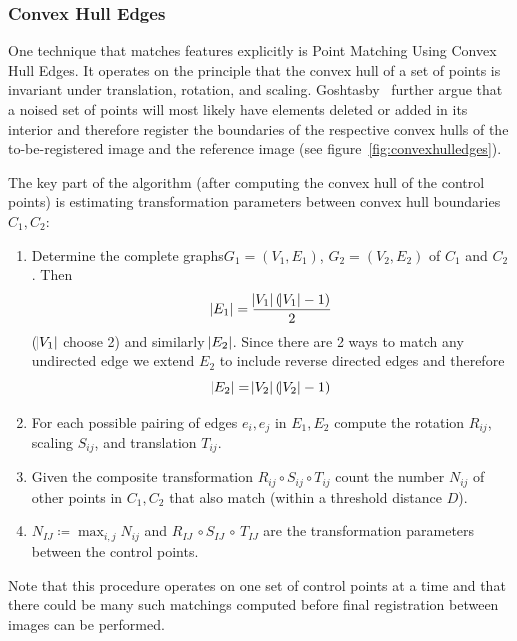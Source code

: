 \subsubsection{Convex Hull Edges}
%
One technique that matches features explicitly is Point Matching Using Convex Hull Edges\cite{Goshtasby1985}.
%
It operates on the principle that the convex hull of a set of points is invariant under translation, rotation, and scaling.
%
Goshtasby \etal~further argue that a noised set of points will most likely have elements deleted or added in its interior and therefore register the boundaries of the respective convex hulls of the to-be-registered image and the reference image (see figure~\ref{fig:convexhulledges}).
%

The key part of the algorithm (after computing the convex hull of the control points) is estimating transformation parameters between convex hull boundaries \(C_1, C_2\):
%
\begin{framed}
	\begin{enumerate}
		\item Determine the complete graphs\footnotemark \(G_1=(V_1, E_1)\), \(G_2 = (V_2,E_2)\) of \(C_1\) and \(C_2\). Then \[\abs{E_1} = \frac{\abs{V_1} (\abs{V_1}-1)}{2}\] (\(\abs{V_1}\) choose 2) and similarly \(\abs{E_2}\). Since there are 2 ways to match any undirected edge we extend \(E_2\) to include reverse directed edges and therefore \[\abs{E_2} = \abs{V_2} (\abs{V_2}-1)\]
		\item For each possible pairing of edges \(e_i, e_j\) in \(E_1, E_2\) compute the rotation \(R_{ij}\), scaling \(S_{ij}\), and translation \(T_{ij}\).
		\item Given the composite transformation \(R_{ij} \circ S_{ij} \circ T_{ij}\) count the number \(N_{ij}\) of other points in \(C_1, C_2\) that also match (within a threshold distance \(D\)).
		\item \(N_{IJ} \coloneqq \max_{i,j} N_{ij}\) and \(R_{IJ}\, \circ S_{IJ}\, \circ\, T_{IJ}\) are the transformation parameters between the control points.
	\end{enumerate}
\end{framed}
\addtocounter{footnote}{-1}
{
	\makeatletter
	\renewcommand\@makefnmark{\hbox{\@textsuperscript{\normalfont\color{white}\@thefnmark}}}
	\renewcommand\@makefntext[1]{%
	  \parindent 1em\noindent
				\hb@xt@1.8em{%
					\hss\@textsuperscript{\normalfont\@thefnmark}}#1}
	\makeatother

}
%
Note that this procedure operates on one set of control points at a time and that there could be many such matchings computed before final registration between images can be performed.

